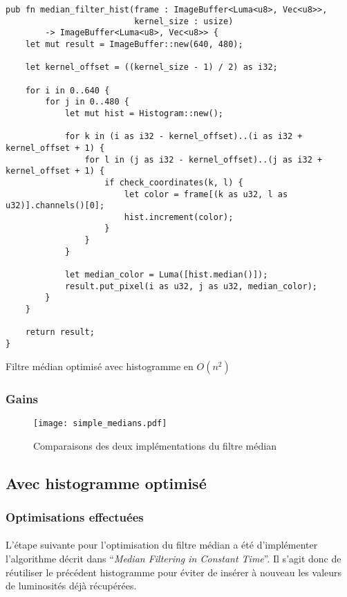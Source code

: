 \documentclass{report}
\begin{document}
\begin{listing}[H]
\begin{verbatim}
pub fn median_filter_hist(frame : ImageBuffer<Luma<u8>, Vec<u8>>,
                          kernel_size : usize)
		-> ImageBuffer<Luma<u8>, Vec<u8>> {
	let mut result = ImageBuffer::new(640, 480);

	let kernel_offset = ((kernel_size - 1) / 2) as i32;

	for i in 0..640 {
		for j in 0..480 {
			let mut hist = Histogram::new();

			for k in (i as i32 - kernel_offset)..(i as i32 + kernel_offset + 1) {
				for l in (j as i32 - kernel_offset)..(j as i32 + kernel_offset + 1) {
					if check_coordinates(k, l) {
						let color = frame[(k as u32, l as u32)].channels()[0];
						hist.increment(color);
					}
				}
			}

			let median_color = Luma([hist.median()]);
			result.put_pixel(i as u32, j as u32, median_color);
		}
	}

	return result;
}
\end{verbatim}
\label{lst:median_filter_hist}
\caption{Filtre médian optimisé avec histogramme en $O(n^2)$}
\end{listing}

\subsubsection{Gains}

\begin{figure}[H]
	\centering
	\texttt{[image: simple\_medians.pdf]}%
	\label{fig:simple_medians}
	\caption{Comparaisons des deux implémentations du filtre médian}
\end{figure}

\subsection{Avec histogramme optimisé}

\subsubsection{Optimisations effectuées}

\paragraph{} L'étape suivante pour l'optimisation du filtre médian a été
d'implémenter l'algorithme décrit dans ``\textit{Median Filtering in Constant
	Time}''. Il s'agit donc de réutiliser le précédent histogramme pour éviter
de insérer à nouveau les valeurs de luminosités déjà récupérées.
\end{document}
